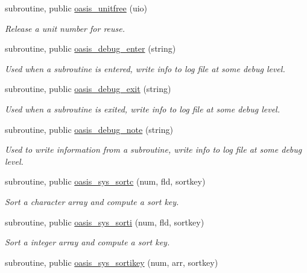 \begin{DoxyCompactItemize}
subroutine, public \hyperlink{namespacemod__oasis__sys_a892ed9f46e2e8f577f1a2670f74695d6}{oasis\+\_\+unitfree} (uio)
\begin{DoxyCompactList}\small\item\em Release a unit number for reuse. \end{DoxyCompactList}\item 
subroutine, public \hyperlink{namespacemod__oasis__sys_ab963e928a34a1521ec2c1921cc956cc5}{oasis\+\_\+debug\+\_\+enter} (string)
\begin{DoxyCompactList}\small\item\em Used when a subroutine is entered, write info to log file at some debug level. \end{DoxyCompactList}\item 
subroutine, public \hyperlink{namespacemod__oasis__sys_a349f71cba2df935179d78f3858992c83}{oasis\+\_\+debug\+\_\+exit} (string)
\begin{DoxyCompactList}\small\item\em Used when a subroutine is exited, write info to log file at some debug level. \end{DoxyCompactList}\item 
subroutine, public \hyperlink{namespacemod__oasis__sys_a8e488f6a9a829762324519c6dd493912}{oasis\+\_\+debug\+\_\+note} (string)
\begin{DoxyCompactList}\small\item\em Used to write information from a subroutine, write info to log file at some debug level. \end{DoxyCompactList}\item 
subroutine, public \hyperlink{namespacemod__oasis__sys_ab2aa592727d1e5bea728281679d5ca8d}{oasis\+\_\+sys\+\_\+sortc} (num, fld, sortkey)
\begin{DoxyCompactList}\small\item\em Sort a character array and compute a sort key. \end{DoxyCompactList}\item 
subroutine, public \hyperlink{namespacemod__oasis__sys_a0deb9712f58a255d6ae938af2ed8b35c}{oasis\+\_\+sys\+\_\+sorti} (num, fld, sortkey)
\begin{DoxyCompactList}\small\item\em Sort a integer array and compute a sort key. \end{DoxyCompactList}\item 
subroutine, public \hyperlink{namespacemod__oasis__sys_ae73e75ed1a8aaba9da01d79ad3276e13}{oasis\+\_\+sys\+\_\+sortikey} (num, arr, sortkey)

\end{DoxyCompactItemize}
